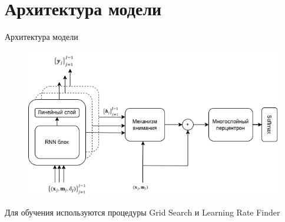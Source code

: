 \documentclass[10pt,pdf,hyperref={unicode}]{beamer}
\renewcommand{\figurename}{}{}%
\renewcommand{\figurename}{\relax}%
\begin{document}
\section{Архитектура модели}
\begin{frame}{Архитектура модели }
	
	
	\begin{figure}[h!]
		
		\begin{minipage}{0.8\textwidth}
			\centering
			\includegraphics[width=\linewidth]{../figures/dynamic_deephit_scheme_only_architecture.png}
			\renewcommand{\figurename}{}{}%
		\end{minipage}
	\end{figure}
	
	
Для обучения используются процедуры Grid Search и Learning Rate Finder
\end{frame}

\end{document}
